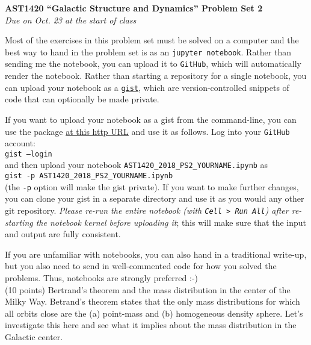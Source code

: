 \documentclass[12pt]{article}
\begin{document}
\begin{center}
{\bf \LARGE AST1420 ``Galactic Structure and Dynamics'' Problem Set 2}\\[7pt]
\emph{Due on Oct. 23 at the start of class}\\[7pt]
\end{center}

Most of the exercises in this problem set must be solved on a computer
and the best way to hand in the problem set is as an \texttt{jupyter
  notebook}. Rather than sending me the notebook, you can upload it to
\texttt{GitHub}, which will automatically render the notebook. Rather
than starting a repository for a single notebook, you can upload your
notebook as a \texttt{\href{https://gist.github.com/}{gist}}, which
are version-controlled snippets of code that can optionally be made
private.

If you want to upload your notebook as a gist from the command-line,
you can use the package \href{http://github.com/defunkt/gist}{at this
  http URL} and use it as follows. Log into your \texttt{GitHub}
account:\\

\texttt{gist --login}\\

and then upload your notebook
\texttt{AST1420\_2018\_PS2\_YOURNAME.ipynb} as\\

\texttt{gist -p AST1420\_2018\_PS2\_YOURNAME.ipynb}\\

(the \texttt{-p} option will make the gist private). If you want to
make further changes, you can clone your gist in a separate directory
and use it as you would any other git repository. \emph{Please re-run
  the entire notebook (with \texttt{Cell > Run All}) after re-starting
  the notebook kernel before uploading it}; this will make sure that
the input and output are fully consistent. 

If you are unfamiliar with notebooks, you can also hand in a
traditional write-up, but you also need to send in well-commented code
for how you solved the problems. Thus, notebooks are strongly
preferred :-)\\



 (10 points) Bertrand's theorem and the mass
distribution in the center of the Milky Way. Betrand's theorem states
that the only mass distributions for which all orbits close are the
(a) point-mass and (b) homogeneous density sphere. Let's investigate
this here and see what it implies about the mass distribution in the
Galactic center.\\
\end{document}
